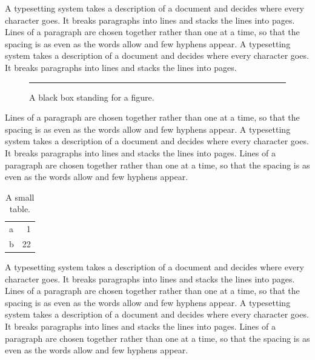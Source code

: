 \documentclass{article}
\begin{document}
A typesetting system takes a description of a document and decides where every character goes. It breaks paragraphs into lines and stacks the lines into pages. Lines of a paragraph are chosen together rather than one at a time, so that the spacing is as even as the words allow and few hyphens appear. A typesetting system takes a description of a document and decides where every character goes. It breaks paragraphs into lines and stacks the lines into pages.

\begin{figure}[ht]
\rule{4cm}{2cm}
\caption{A black box standing for a figure.}
\end{figure}

Lines of a paragraph are chosen together rather than one at a time, so that the spacing is as even as the words allow and few hyphens appear. A typesetting system takes a description of a document and decides where every character goes. It breaks paragraphs into lines and stacks the lines into pages. Lines of a paragraph are chosen together rather than one at a time, so that the spacing is as even as the words allow and few hyphens appear.

\begin{table}[t]
\centering
\begin{tabular}{lr}
a & 1 \\
b & 22 \\
\end{tabular}
\caption{A small table.}
\end{table}

A typesetting system takes a description of a document and decides where every character goes. It breaks paragraphs into lines and stacks the lines into pages. Lines of a paragraph are chosen together rather than one at a time, so that the spacing is as even as the words allow and few hyphens appear. A typesetting system takes a description of a document and decides where every character goes. It breaks paragraphs into lines and stacks the lines into pages. Lines of a paragraph are chosen together rather than one at a time, so that the spacing is as even as the words allow and few hyphens appear.
\end{document}
